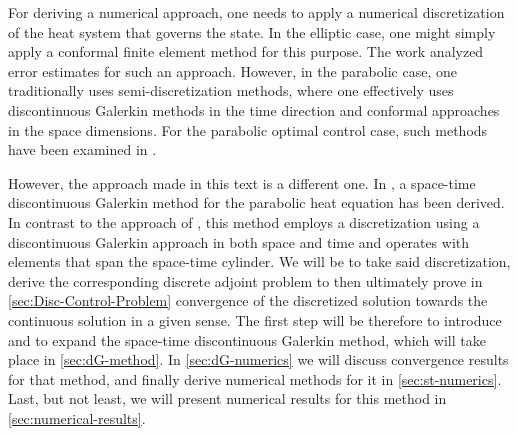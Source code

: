 \documentclass[../thesis.tex]{subfiles}
\begin{document}
For deriving a numerical approach, one needs to apply a numerical discretization of the heat system that governs the state. In the elliptic case, one might simply apply a conformal finite element method for this purpose. The work \cite{Hinze} analyzed error estimates for such an approach.
However, in the parabolic case, one traditionally uses semi-discretization methods, where one effectively uses discontinuous Galerkin methods in the time direction and conformal approaches in the space dimensions. For the parabolic optimal control case, such methods have been examined in \cite{MeidnerVexler-I,MeidnerVexler-II}.

However, the approach made in this text is a different one.
In \cite{Neumueller}, a space-time discontinuous Galerkin method for the parabolic heat equation has been derived.
In contrast to the approach of \cite{MeidnerVexler-I}, this method employs a discretization using a discontinuous Galerkin approach in both space and time and operates with elements that span the space-time cylinder.
We will be to take said discretization, derive the corresponding discrete adjoint problem to then ultimately prove in \cref{sec:Disc-Control-Problem} convergence of the discretized solution towards the continuous solution in a given sense.
The first step will be therefore to introduce and to expand the space-time discontinuous Galerkin method, which will take place in \cref{sec:dG-method}. In \cref{sec:dG-numerics} we will discuss convergence results for that method, and finally derive numerical methods for it in \cref{sec:st-numerics}.
Last, but not least, we will present numerical results for this method in \cref{sec:numerical-results}.
\end{document}
